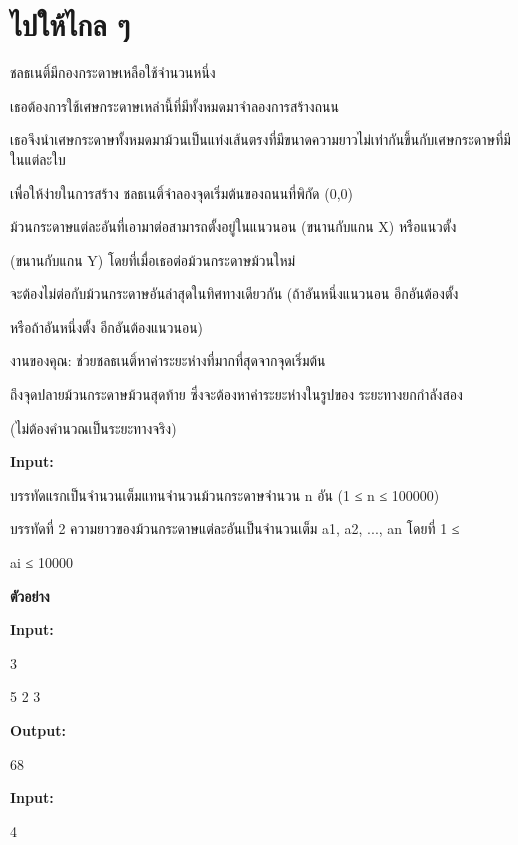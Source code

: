 \documentclass{article}
\begin{document}
\section*{ไปให้ไกล ๆ}

ชลธเนติ์มีกองกระดาษเหลือใช้จำนวนหนึ่ง

เธอต้องการใช้เศษกระดาษเหล่านี้ที่มีทั้งหมดมาจำลองการสร้างถนน

เธอจึงนำเศษกระดาษทั้งหมดมาม้วนเป็นแท่งเส้นตรงที่มีขนาดความยาวไม่เท่ากันขึ้นกับเศษกระดาษที่มีในแต่ละใบ

เพื่อให้ง่ายในการสร้าง ชลธเนติ์จำลองจุดเริ่มต้นของถนนที่พิกัด (0,0)

ม้วนกระดาษแต่ละอันที่เอามาต่อสามารถตั้งอยู่ในแนวนอน (ขนานกับแกน X) หรือแนวตั้ง

(ขนานกับแกน Y) โดยที่เมื่อเธอต่อม้วนกระดาษม้วนใหม่

จะต้องไม่ต่อกับม้วนกระดาษอันล่าสุดในทิศทางเดียวกัน (ถ้าอันหนึ่งแนวนอน อีกอันต้องตั้ง

หรือถ้าอันหนึ่งตั้ง อีกอันต้องแนวนอน)



งานของคุณ: ช่วยชลธเนติ์หาค่าระยะห่างที่มากที่สุดจากจุดเริ่มต้น

ถึงจุดปลายม้วนกระดาษม้วนสุดท้าย ซึ่งจะต้องหาค่าระยะห่างในรูปของ ระยะทางยกกำลังสอง

(ไม่ต้องคำนวณเป็นระยะทางจริง)



\textbf{Input:}



บรรทัดแรกเป็นจำนวนเต็มแทนจำนวนม้วนกระดาษจำนวน n อัน (1 ≤ n ≤ 100000)



บรรทัดที่ 2 ความยาวของม้วนกระดาษแต่ละอันเป็นจำนวนเต็ม a1, a2, ..., an โดยที่ 1 ≤

ai ≤ 10000



\textbf{ตัวอย่าง}



\textbf{Input:}



3



5 2 3



\textbf{Output:}



68



\textbf{Input:}



4
\end{document}

